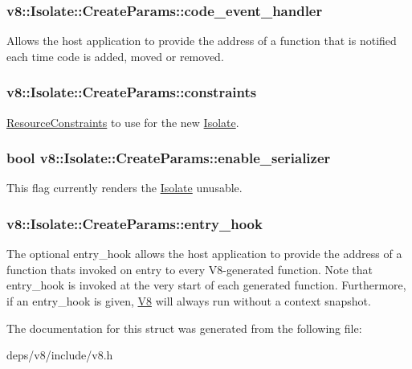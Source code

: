 \subsubsection[{code\+\_\+event\+\_\+handler}]{ v8\+::\+Isolate\+::\+Create\+Params\+::code\+\_\+event\+\_\+handler}\label{structv8_1_1_isolate_1_1_create_params_a783e3eba90ce6e2800bdd69197bbccdd}
Allows the host application to provide the address of a function that is notified each time code is added, moved or removed. \hypertarget{structv8_1_1_isolate_1_1_create_params_a2c570b306aa8c1c24cfe70e8eee50fa1}{}
\subsubsection[{constraints}]{ v8\+::\+Isolate\+::\+Create\+Params\+::constraints}\label{structv8_1_1_isolate_1_1_create_params_a2c570b306aa8c1c24cfe70e8eee50fa1}
\hyperlink{classv8_1_1_resource_constraints}{Resource\+Constraints} to use for the new \hyperlink{classv8_1_1_isolate}{Isolate}. \hypertarget{structv8_1_1_isolate_1_1_create_params_a6dae371b4c28bf7e8b3534dc24f13323}{}
\subsubsection[{enable\+\_\+serializer}]{\setlength{\rightskip}{0pt plus 5cm}bool v8\+::\+Isolate\+::\+Create\+Params\+::enable\+\_\+serializer}\label{structv8_1_1_isolate_1_1_create_params_a6dae371b4c28bf7e8b3534dc24f13323}
This flag currently renders the \hyperlink{classv8_1_1_isolate}{Isolate} unusable. \hypertarget{structv8_1_1_isolate_1_1_create_params_aa7aa18bbe2d86713e5b074a93b38dc60}{}
\subsubsection[{entry\+\_\+hook}]{ v8\+::\+Isolate\+::\+Create\+Params\+::entry\+\_\+hook}\label{structv8_1_1_isolate_1_1_create_params_aa7aa18bbe2d86713e5b074a93b38dc60}
The optional entry\+\_\+hook allows the host application to provide the address of a function that\textquotesingle{}s invoked on entry to every V8-\/generated function. Note that entry\+\_\+hook is invoked at the very start of each generated function. Furthermore, if an entry\+\_\+hook is given, \hyperlink{classv8_1_1_v8}{V8} will always run without a context snapshot. 

The documentation for this struct was generated from the following file\+:\begin{DoxyCompactItemize}
\item 
deps/v8/include/v8.\+h\end{DoxyCompactItemize}
